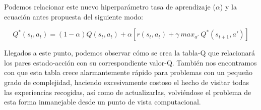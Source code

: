Podemos relacionar este nuevo hiperparámetro tasa de aprendizaje ($\alpha$) y la ecuación antes propuesta del siguiente modo:

\begin{equation}
    Q^*(s_{t}, a_{t}) = (1-\alpha ) Q(s_{t}, a_{t}) + \alpha [r(s_{t}, a_{t}) + \gamma\ max_{a'}\ Q^*(s_{t+1}, a')]
\end{equation}

Llegados a este punto, podemos observar cómo se crea la tabla-Q que relacionará los pares estado-acción con su correspondiente valor-Q. También nos encontramos con que esta tabla crece alarmantemente rápido para problemas con un pequeño grado de complejidad, haciendo excesivamente costoso el hecho de visitar todas las experiencias recogidas, así como de actualizarlas, volviéndose el problema de esta forma inmanejable desde un punto de vista computacional.